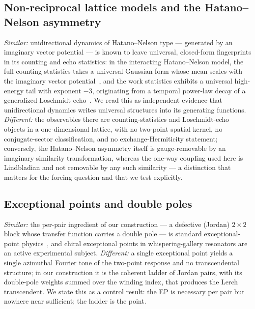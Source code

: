 \documentclass[11pt,a4paper]{article}
\begin{document}
\subsection{Non-reciprocal lattice models and the Hatano--Nelson asymmetry}
\label{sec:hn}

\emph{Similar:} unidirectional dynamics of Hatano--Nelson type --- generated by
an imaginary vector potential --- is known to leave universal, closed-form
fingerprints in its counting and echo statistics: in the interacting
Hatano--Nelson model, the full counting statistics takes a universal Gaussian
form whose mean scales with the imaginary vector
potential~\cite{DoraMoca2022}, and the work statistics exhibits a universal
high-energy tail with exponent $-3$, originating from a temporal power-law
decay of a generalized Loschmidt echo~\cite{DoraMoca2023}. We read this as
independent evidence that unidirectional dynamics writes universal structures
into its generating functions. \emph{Different:} the observables there are
counting-statistics and Loschmidt-echo objects in a one-dimensional lattice,
with no two-point spatial kernel, no conjugate-sector classification, and no
exchange-Hermiticity statement; conversely, the Hatano--Nelson asymmetry
itself is gauge-removable by an imaginary similarity transformation, whereas
the one-way coupling used here is Lindbladian and not removable by any such
similarity --- a distinction that matters for the forcing question and that we
test explicitly.

\subsection{Exceptional points and double poles}

\emph{Similar:} the per-pair ingredient of our construction --- a defective
(Jordan) $2\times 2$ block whose transfer function carries a double pole --- is
standard exceptional-point physics~\cite{Heiss2012}, and chiral exceptional
points in whispering-gallery resonators are an active experimental subject.
\emph{Different:} a single exceptional point yields a single azimuthal Fourier
tone of the two-point response and no transcendental structure; in our
construction it is the coherent ladder of Jordan pairs, with its double-pole
weights summed over the winding index, that produces the Lerch transcendent. We
state this as a control result: the EP is necessary per pair but nowhere near
sufficient; the ladder is the point.
\end{document}
